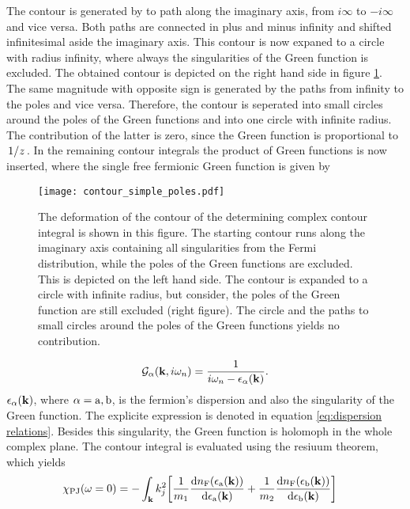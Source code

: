 The contour is generated by to path along the imaginary axis, from $i\infty$ to $-i\infty$ and vice versa.
Both paths are connected in plus and minus infinity and shifted infinitesimal aside the imaginary axis.
This contour is now expaned to a circle with radius infinity, where always the singularities of the Green function is excluded.
The obtained contour is depicted on the right hand side in figure \ref{fig:contour simple poles}.
The same magnitude with opposite sign is generated by the paths from infinity to the poles and vice versa.
Therefore, the contour is seperated into small circles around the poles of the Green functions and into one circle with infinite radius.
The contribution of the latter is zero, since the Green function is proportional to $\flatfrac{1}{z}$.
In the remaining contour integrals the product of Green functions is now inserted, where the single free fermionic Green function is given by
%
\begin{figure}[t]
	\centering
	\texttt{[image: contour\_simple\_poles.pdf]}
	\caption{
The deformation of the contour of the determining complex contour integral is shown in this figure.
The starting contour runs along the imaginary axis containing all singularities from the Fermi distribution, while the poles of the Green functions are excluded.
This is depicted on the left hand side.
The contour is expanded to a circle with infinite radius, but consider, the poles of the Green function are still excluded (right figure).
The circle and the paths to small circles around the poles of the Green functions yields no contribution.
	}
	\label{fig:contour simple poles}
\end{figure}
%
%
\begin{align}
	\mathcal{G}_{\alpha}(\vb{k}, i\omega_{n}) = \frac{1}{i\omega_{n} - \epsilon_{\alpha}(\vb{k})}.
\end{align}
%
$\epsilon_{\alpha}(\vb{k})$, where $\alpha = \mathrm{a},\mathrm{b}$, is the fermion's dispersion and also the singularity of the Green function.
The explicite expression is denoted in equation \eqref{eq:dispersion relations}.
Besides this singularity, the Green function is holomoph in the whole complex plane.
The contour integral is evaluated using the resiuum theorem, which yields
%
\begin{align}
	\chi_{\mathrm{PJ}}(\omega = 0) &= 
		- \int_{\vb{k}} 
		k_{j}^{2}
		\bigg[
			\frac{1}{m_{1}}
			\dv{n_{\mathrm{F}}(\epsilon_{\mathrm{a}}(\vb{k}))}{\epsilon_{\mathrm{a}}(\vb{k})}
			+
			\frac{1}{m_{2}}
			\dv{n_{\mathrm{F}}(\epsilon_{\mathrm{b}}(\vb{k}))}{\epsilon_{\mathrm{b}}(\vb{k})}
		\bigg]
\end{align}
